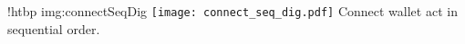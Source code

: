 \namedfigure
{!htbp}
{img:connectSeqDig}
{\texttt{[image: connect\_seq\_dig.pdf]}}
{Connect wallet act in sequential order.}
